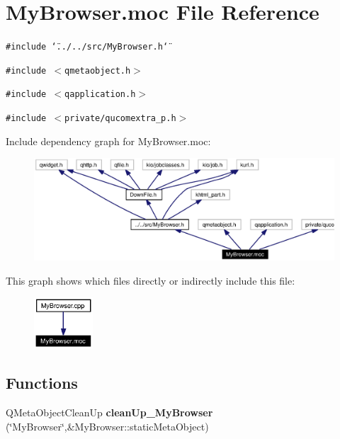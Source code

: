 \section{My\-Browser.moc File Reference}
\label{MyBrowser_8moc}


{\tt \#include \char`\"{}../../src/My\-Browser.h\char`\"{}}\par
{\tt \#include $<$qmetaobject.h$>$}\par
{\tt \#include $<$qapplication.h$>$}\par
{\tt \#include $<$private/qucomextra\_\-p.h$>$}\par


Include dependency graph for My\-Browser.moc:\begin{figure}[H]
\begin{center}
\leavevmode
\includegraphics[width=327pt]{MyBrowser_8moc__incl}
\end{center}
\end{figure}


This graph shows which files directly or indirectly include this file:\begin{figure}[H]
\begin{center}
\leavevmode
\includegraphics[width=62pt]{MyBrowser_8moc__dep__incl}
\end{center}
\end{figure}
\subsection*{Functions}
\begin{CompactItemize}
\item 
QMeta\-Object\-Clean\-Up {\bf clean\-Up\_\-My\-Browser} (\char`\"{}My\-Browser\char`\"{},\&My\-Browser::static\-Meta\-Object)
\end{CompactItemize}


